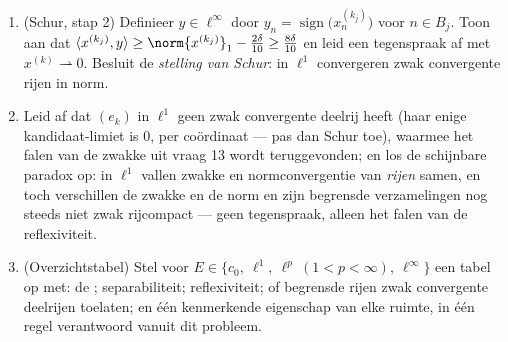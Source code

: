 \begin{problem}[{Weekendopgave --- $(\ell^p)' = \ell^q$,
reflexiviteit, en het vreemde van $\ell^\infty$}]
\begin{enumerate}[resume]
        functionalen?), en construeer daarna recursief indices
        $k_1 < k_2 < \cdots$ en gehele getallen $0 = N_0 < N_1 <
        N_2 < \cdots$ zodanig dat de massa van $x^{(k_j)}$ zich
        concentreert op het blok $B_j =
        \intoc{N_{j-1}}{N_j}$:
        \[
        \sum_{n \in B_j}\bigl|x^{(k_j)}_n\bigr| \geq
        \norm{x^{(k_j)}}_1 - \frac\delta{10} .
        \]
  \item (Schur, stap 2) Definieer $y \in \ell^\infty$ door $y_n =
        \operatorname{sign}\bigl(x^{(k_j)}_n\bigr)$ voor $n \in
        B_j$. Toon aan dat $\langle x^{(k_j)}, y\rangle \geq
        \norm{x^{(k_j)}}_1 - \frac{2\delta}{10} \geq
        \frac{8\delta}{10}$ en leid een tegenspraak af met
        $x^{(k)} \rightharpoonup 0$. Besluit de \emph{stelling van
        Schur}: in $\ell^1$ convergeren zwak convergente rijen in
        norm.
  \item Leid af dat $(e_k)$ in $\ell^1$ geen zwak convergente
        deelrij heeft (haar enige kandidaat-limiet is $0$, per
        coördinaat --- pas dan Schur toe), waarmee het falen van
        de zwakke  uit vraag 13 wordt teruggevonden; en
        los de schijnbare paradox op: in $\ell^1$ vallen zwakke en
        normconvergentie van \emph{rijen} samen, en toch
        verschillen de zwakke en de norm\emph{} en zijn
        begrensde verzamelingen nog steeds niet zwak rijcompact
        --- geen tegenspraak, alleen het falen van de
        reflexiviteit.
  \item (Overzichtstabel) Stel voor $E \in \{c_0,\ \ell^1,\
        \ell^p\ (1{<}p{<}\infty),\ \ell^\infty\}$ een tabel op
        met: de ; separabiliteit; reflexiviteit; of
        begrensde rijen zwak convergente deelrijen toelaten; en
        één kenmerkende eigenschap van elke ruimte, in één regel
        verantwoord vanuit dit probleem.
\end{enumerate}


\end{problem}
